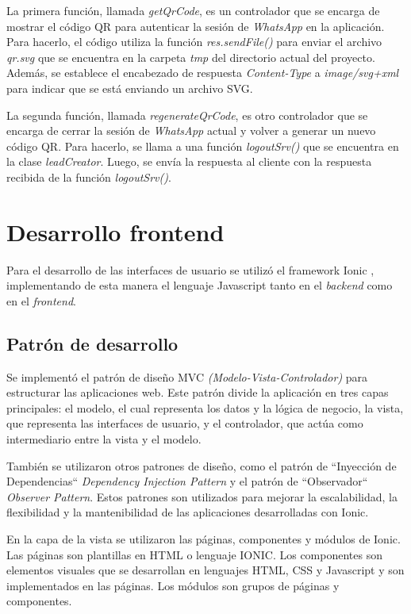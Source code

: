 La primera función, llamada \textit{getQrCode}, es un controlador que se encarga de mostrar el código QR para autenticar la sesión de \textit{WhatsApp} en la aplicación. Para hacerlo, el código utiliza la función \textit{res.sendFile()} para enviar el archivo \textit{qr.svg} que se encuentra en la carpeta \textit{tmp} del directorio actual del proyecto. Además, se establece el encabezado de respuesta \textit{Content-Type} a \textit{image/svg+xml} para indicar que se está enviando un archivo SVG.

La segunda función, llamada \textit{regenerateQrCode}, es otro controlador que se encarga de cerrar la sesión de \textit{WhatsApp} actual y volver a generar un nuevo código QR. Para hacerlo, se llama a una función \textit{logoutSrv()} que se encuentra en la clase \textit{leadCreator}. Luego, se envía la respuesta al cliente con la respuesta recibida de la función \textit{logoutSrv()}.


\section{Desarrollo frontend}
\label{sec:secarquitecturafrontend}
Para el desarrollo de las interfaces de usuario se utilizó el framework Ionic \cite{WEBSITE:ionic}, implementando de esta manera el lenguaje Javascript tanto en el \textit{backend} como en el \textit{frontend}.

\subsection{Patrón de desarrollo}
\label{subsec:frontpatron}

Se implementó el patrón de diseño MVC \citep{mvc} \textit{(Modelo-Vista-Controlador)} para estructurar las aplicaciones web. Este patrón divide la aplicación en tres capas principales: el modelo, el cual representa los datos y la lógica de negocio, la vista, que representa las interfaces de usuario, y el controlador, que actúa como intermediario entre la vista y el modelo.

También se utilizaron otros patrones de diseño, como el patrón de ``Inyección de Dependencias`` \citep{dependency-injection} \textit{Dependency Injection Pattern} y el patrón de ``Observador`` \citep{observer-pattern} \textit{Observer Pattern}. Estos patrones son utilizados para mejorar la escalabilidad, la flexibilidad y la mantenibilidad de las aplicaciones desarrolladas con Ionic.

En la capa de la vista se utilizaron las páginas, componentes y módulos de Ionic. Las páginas son plantillas en HTML o lenguaje IONIC. Los componentes son elementos visuales que se desarrollan en lenguajes HTML, CSS y Javascript y son implementados en las páginas. Los módulos son grupos de páginas y componentes. 


